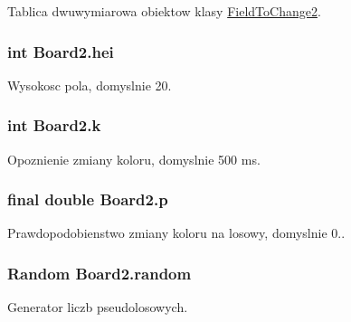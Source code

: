Tablica dwuwymiarowa obiektow klasy \hyperlink{classFieldToChange2}{Field\-To\-Change2}. 

\hypertarget{classBoard2_a465a4d61359fc92c11cafdd8d0745ec0}{
\subsubsection[{hei}]{\setlength{\rightskip}{0pt plus 5cm}int Board2.\-hei\hspace{0.3cm}{\ttfamily [package]}}}\label{classBoard2_a465a4d61359fc92c11cafdd8d0745ec0}


Wysokosc pola, domyslnie 20. 

\hypertarget{classBoard2_a0c416dfe261333a6ef3dcd7f7b38b234}{
\subsubsection[{k}]{\setlength{\rightskip}{0pt plus 5cm}int Board2.\-k\hspace{0.3cm}{\ttfamily [package]}}}\label{classBoard2_a0c416dfe261333a6ef3dcd7f7b38b234}


Opoznienie zmiany koloru, domyslnie 500 ms. 

\hypertarget{classBoard2_a697bd8c3fd4b418c6570a9ad6c6dfdf9}{
\subsubsection[{p}]{\setlength{\rightskip}{0pt plus 5cm}final double Board2.\-p\hspace{0.3cm}{\ttfamily [package]}}}\label{classBoard2_a697bd8c3fd4b418c6570a9ad6c6dfdf9}


Prawdopodobienstwo zmiany koloru na losowy, domyslnie 0.. 

\hypertarget{classBoard2_ada7b5c5a270ea7e76387dae977fc3cdd}{
\subsubsection[{random}]{\setlength{\rightskip}{0pt plus 5cm}Random Board2.\-random\hspace{0.3cm}{\ttfamily [package]}}}\label{classBoard2_ada7b5c5a270ea7e76387dae977fc3cdd}


Generator liczb pseudolosowych. 

